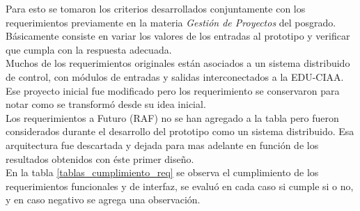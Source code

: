 Para esto se tomaron los criterios desarrollados conjuntamente con los requerimientos previamente en la materia \emph{Gestión de Proyectos} del posgrado. Básicamente consiste en variar los valores de los entradas al prototipo y verificar que cumpla con la respuesta adecuada.\\
Muchos de los requerimientos originales están asociados a un sistema distribuido de control, con módulos de entradas y salidas interconectados a la EDU-CIAA. Ese proyecto inicial fue modificado pero los requerimiento se conservaron para notar como se transformó desde su idea inicial.\\

Los requerimientos a Futuro (RAF) no se han agregado a la tabla pero fueron considerados durante el desarrollo del prototipo como un sistema distribuido. Esa arquitectura fue descartada y dejada para mas adelante en función de los resultados obtenidos con éste primer diseño.\\

En la tabla \ref{tablas_cumplimiento_req} se observa el cumplimiento de los requerimientos funcionales y de interfaz, se evaluó en cada caso si cumple si o no, y en caso negativo se agrega una observación.

